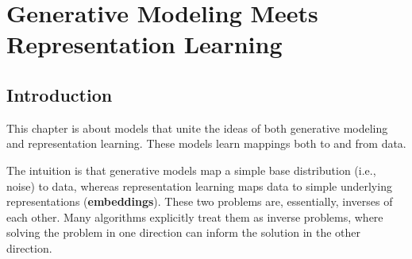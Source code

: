 \chapter{Generative Modeling Meets Representation Learning}\label{chapter:generative_modeling_and_representation_learning}

\section{Introduction}

This chapter is about models that unite the ideas of both generative modeling and representation learning. These models learn mappings both to and from data.%

The intuition is that generative models map a simple base distribution (i.e., noise) to data, whereas representation learning maps data to simple underlying representations (\textbf{embeddings}). These two problems are, essentially, inverses of each other. Many algorithms explicitly treat them as inverse problems, where solving the problem in one direction can inform the solution in the other direction.

